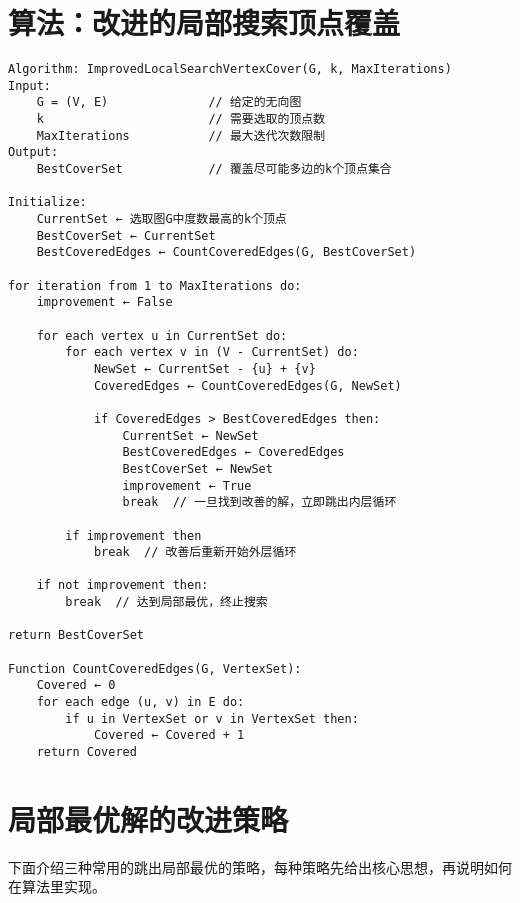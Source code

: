 \documentclass{article}
\begin{document}
\section*{算法：改进的局部搜索顶点覆盖}
\begin{lstlisting}[caption={ImprovedLocalSearchVertexCover},label={lst:localsearch}]
Algorithm: ImprovedLocalSearchVertexCover(G, k, MaxIterations)
Input:
    G = (V, E)              // 给定的无向图
    k                       // 需要选取的顶点数
    MaxIterations           // 最大迭代次数限制
Output:
    BestCoverSet            // 覆盖尽可能多边的k个顶点集合

Initialize:
    CurrentSet ← 选取图G中度数最高的k个顶点
    BestCoverSet ← CurrentSet
    BestCoveredEdges ← CountCoveredEdges(G, BestCoverSet)

for iteration from 1 to MaxIterations do:
    improvement ← False

    for each vertex u in CurrentSet do:
        for each vertex v in (V - CurrentSet) do:
            NewSet ← CurrentSet - {u} + {v}
            CoveredEdges ← CountCoveredEdges(G, NewSet)

            if CoveredEdges > BestCoveredEdges then:
                CurrentSet ← NewSet
                BestCoveredEdges ← CoveredEdges
                BestCoverSet ← NewSet
                improvement ← True
                break  // 一旦找到改善的解，立即跳出内层循环

        if improvement then
            break  // 改善后重新开始外层循环

    if not improvement then:
        break  // 达到局部最优，终止搜索

return BestCoverSet

Function CountCoveredEdges(G, VertexSet):
    Covered ← 0
    for each edge (u, v) in E do:
        if u in VertexSet or v in VertexSet then:
            Covered ← Covered + 1
    return Covered
\end{lstlisting}
\newpage
\section*{局部最优解的改进策略}

下面介绍三种常用的跳出局部最优的策略，每种策略先给出核心思想，再说明如何在算法里实现。
\end{document}
